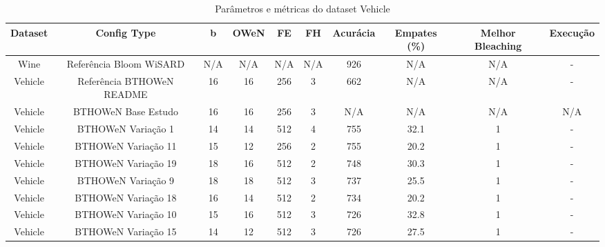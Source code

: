 \documentclass{article}
\begin{document}
\begin{longtable}{|c|c|c|c|c|c|c|c|c|c|}
\caption{Parâmetros e métricas do dataset Vehicle} \\
\hline
\textbf{Dataset} & \textbf{Config Type} & \textbf{b} & \textbf{OWeN} & \textbf{FE} & \textbf{FH} & \textbf{Acurácia} & \textbf{Empates (\%)} & \textbf{Melhor Bleaching} & \textbf{Execução} \\
\hline
Wine & Referência Bloom WiSARD & N/A & N/A & N/A & N/A & 926 & N/A & N/A & - \\
\hline
Vehicle & Referência BTHOWeN README & 16 & 16 & 256 & 3 & 662 & N/A & N/A & - \\
\hline
Vehicle & BTHOWeN Base Estudo & 16 & 16 & 256 & 3 & N/A & N/A & N/A & N/A \\
\hline
Vehicle & BTHOWeN Variação 1 & 14 & 14 & 512 & 4 & 755 & 32.1 & 1 & - \\
\hline
Vehicle & BTHOWeN Variação 11 & 15 & 12 & 256 & 2 & 755 & 20.2 & 1 & - \\
\hline
Vehicle & BTHOWeN Variação 19 & 18 & 16 & 512 & 2 & 748 & 30.3 & 1 & - \\
\hline
Vehicle & BTHOWeN Variação 9 & 18 & 18 & 512 & 3 & 737 & 25.5 & 1 & - \\
\hline
Vehicle & BTHOWeN Variação 18 & 16 & 14 & 512 & 2 & 734 & 20.2 & 1 & - \\
\hline
Vehicle & BTHOWeN Variação 10 & 15 & 16 & 512 & 3 & 726 & 32.8 & 1 & - \\
\hline
Vehicle & BTHOWeN Variação 15 & 14 & 12 & 512 & 3 & 726 & 27.5 & 1 & - \\
\hline
\end{longtable}
\end{document}
